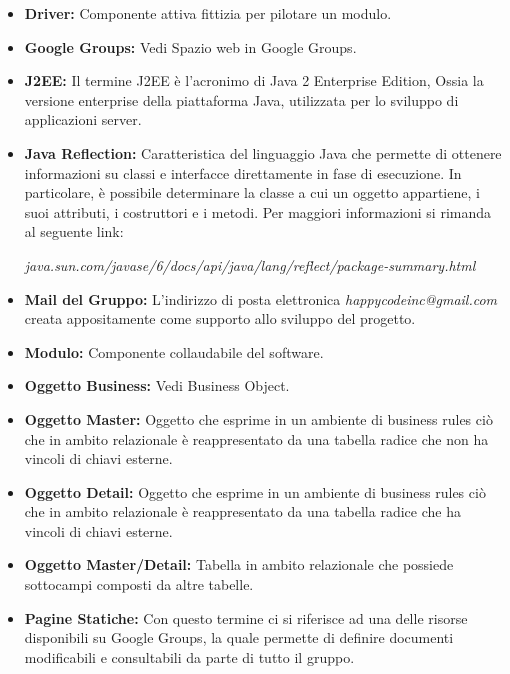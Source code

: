\documentclass[11pt,titlepage,a4paper]{report}
\begin{document}
\begin{itemize}
\item{\textbf{Driver:}
Componente attiva fittizia per pilotare un modulo.}

\item{\textbf{Google Groups:}
Vedi Spazio web in Google Groups. }

\item{\textbf{J2EE:}
Il termine J2EE \`e l'acronimo di Java 2 Enterprise Edition, Ossia la versione enterprise della piattaforma Java, utilizzata per lo sviluppo di applicazioni server.}

\item{\textbf{Java Reflection:}
Caratteristica del linguaggio Java che permette di ottenere informazioni su classi e interfacce direttamente in fase di esecuzione. In particolare, \`e possibile determinare la classe a cui un oggetto appartiene, i suoi attributi, i costruttori e i metodi.
Per maggiori informazioni si rimanda al seguente link:  \begin{small}\textit{java.sun.com/javase/6/docs/api/java/lang/reflect/package-summary.html}\end{small}}

\item{\textbf{Mail del Gruppo:}
L'indirizzo di posta elettronica \textit{happycodeinc@gmail.com} creata appositamente come supporto allo sviluppo del progetto.}

\item{\textbf{Modulo:}
Componente collaudabile del software.}

\item{\textbf{Oggetto Business:}
Vedi Business Object.}

\item{\textbf{Oggetto Master:}
Oggetto che esprime in un ambiente di business rules ci\`o che in ambito relazionale \`e reappresentato da  una tabella radice che non ha vincoli di chiavi esterne.}

\item{\textbf{Oggetto Detail:}
Oggetto che esprime in un ambiente di business rules ci\`o che in ambito relazionale \`e reappresentato da  una tabella radice che ha vincoli di chiavi esterne.}

\item{\textbf{Oggetto Master/Detail:}
Tabella in ambito relazionale che possiede sottocampi composti da altre tabelle.}

\item{\textbf{Pagine Statiche:}
Con questo termine ci si riferisce ad una delle risorse disponibili su Google Groups,  la quale permette di definire documenti modificabili e consultabili da parte di tutto il gruppo.}


\end{itemize}
\end{document}
